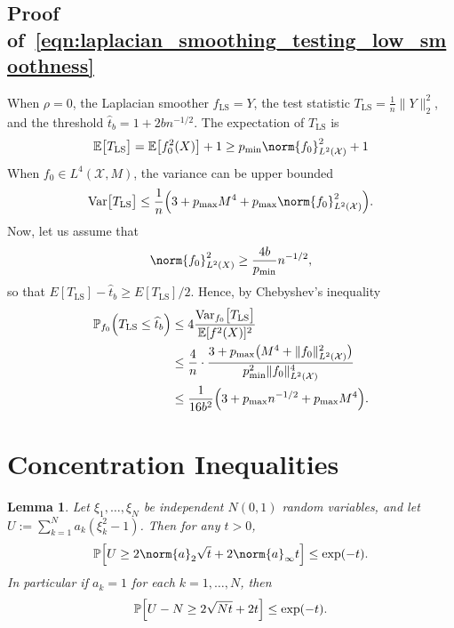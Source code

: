 \documentclass{article}
\newcommand{\Var}{\mathrm{Var}}
\newcommand{\1}{\mathbf{1}}
\newcommand{\Xset}{\mathcal{X}}
\newcommand{\Leb}{L}
\newcommand{\Pbb}{\mathbb{P}}
\newcommand{\Ebb}{\mathbb{E}}
\newcommand{\wh}[1]{\widehat{#1}}
\newcommand{\LS}{\mathrm{LS}}
\theoremstyle{alden}
\theoremstyle{aldenthm}
\newtheorem{lemma}{Lemma}
\theoremstyle{definition}
\theoremstyle{remark}
\begin{document}
\subsection{Proof of~\eqref{eqn:laplacian_smoothing_testing_low_smoothness}}
When $\rho = 0$, the Laplacian smoother $\wh{f}_{\LS} = Y$, the test statistic $T_{\LS} = \frac{1}{n}\|Y\|_2^2$, and the threshold $\wh{t}_b = 1 + 2bn^{-1/2}$. The expectation of $T_{\LS}$ is 
\begin{equation*}
\Ebb\bigl[T_{\LS}\bigr] = \mathbb{E}\bigl[f_0^2(X)\bigr] + 1 \geq p_{\min} \norm{f_0}_{\Leb^2(\Xset)}^2 + 1
\end{equation*}
When $f_0 \in \Leb^4(\Xset,M)$, the variance can be upper bounded
\begin{equation*}
\Var\bigl[T_{\LS}\bigr] \leq \frac{1}{n}\Bigl(3 + p_{\max} M^4 + p_{\max}\norm{f_0}_{\Leb^2(\Xset)}^2\Bigr).
\end{equation*}
Now, let us assume that
\begin{equation*}
\norm{f_0}_{\Leb^2(X)}^2 \geq \frac{4b}{p_{\min}} n^{-1/2},
\end{equation*}
so that $E[T_{\LS}] - \wh{t}_b \geq E[T_{\LS}]/2$. Hence, by Chebyshev's inequality
\begin{align*}
\mathbb{P}_{f_0}\Bigl(T_{\LS} \leq \wh{t}_b \Bigr) & \leq 4 \frac{\Var_{f_0}\bigl[T_{\LS}\bigr]}{\mathbb{E}[f^2(X)]^2} \\
& \leq \frac{4}{n} \cdot \frac{ 3 + p_{\max}\bigl(M^4 + \|f_0\|_{\Leb^2(\Xset)}^2 \bigr)}{p_{\min}^2 \|f_0\|_{\Leb^2(\Xset)}^4} \\
& \leq \frac{1}{16b^2}\Bigl(3 + p_{\max}n^{-1/2} + p_{\max}M^4\Bigr).
\end{align*}

\section{Concentration Inequalities}
\begin{lemma}
	\label{lem:chi_square_bound}
	Let $\xi_1,\ldots,\xi_N$ be independent $N(0,1)$ random variables, and let $U := \sum_{k = 1}^{N} a_k(\xi_k^2 - 1)$.  Then for any $t > 0$,
	\begin{equation*}
	\Pbb\Bigl[U \geq 2 \norm{a}_2 \sqrt{t} + 2 \norm{a}_{\infty}t\Bigr] \leq \exp(-t).
	\end{equation*}
	In particular if $a_k = 1$ for each $k = 1,\ldots,N$, then
	\begin{equation*}
	\Pbb\Bigl[U - N \geq 2\sqrt{N t} + 2t\Bigr] \leq \exp(-t).
	\end{equation*}
\end{lemma}
\end{document}
